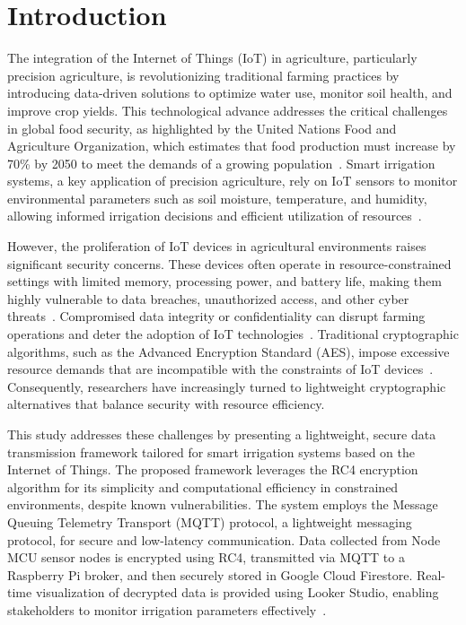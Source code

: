 \documentclass[journal]{Definitions/mdpi}
\begin{document}
\section{Introduction}

The integration of the Internet of Things (IoT) in agriculture, particularly precision agriculture, is revolutionizing traditional farming practices by introducing data-driven solutions to optimize water use, monitor soil health, and improve crop yields. This technological advance addresses the critical challenges in global food security, as highlighted by the United Nations Food and Agriculture Organization, which estimates that food production must increase by 70\% by 2050 to meet the demands of a growing population~\cite{ref-report1}. Smart irrigation systems, a key application of precision agriculture, rely on IoT sensors to monitor environmental parameters such as soil moisture, temperature, and humidity, allowing informed irrigation decisions and efficient utilization of resources~\cite{ref-mdpi1}.

However, the proliferation of IoT devices in agricultural environments raises significant security concerns. These devices often operate in resource-constrained settings with limited memory, processing power, and battery life, making them highly vulnerable to data breaches, unauthorized access, and other cyber threats~\cite{ref-mdpi2, ref-standards1}. Compromised data integrity or confidentiality can disrupt farming operations and deter the adoption of IoT technologies~\cite{ref-mdpi3}. Traditional cryptographic algorithms, such as the Advanced Encryption Standard (AES), impose excessive resource demands that are incompatible with the constraints of IoT devices~\cite{ref-mdpi4, ref-journal2}. Consequently, researchers have increasingly turned to lightweight cryptographic alternatives that balance security with resource efficiency.

This study addresses these challenges by presenting a lightweight, secure data transmission framework tailored for smart irrigation systems based on the Internet of Things. The proposed framework leverages the RC4 encryption algorithm for its simplicity and computational efficiency in constrained environments, despite known vulnerabilities. The system employs the Message Queuing Telemetry Transport (MQTT) protocol, a lightweight messaging protocol, for secure and low-latency communication. Data collected from Node MCU sensor nodes is encrypted using RC4, transmitted via MQTT to a Raspberry Pi broker, and then securely stored in Google Cloud Firestore. Real-time visualization of decrypted data is provided using Looker Studio, enabling stakeholders to monitor irrigation parameters effectively~\cite{ref-cloud1, ref-cloud2}.
\end{document}
